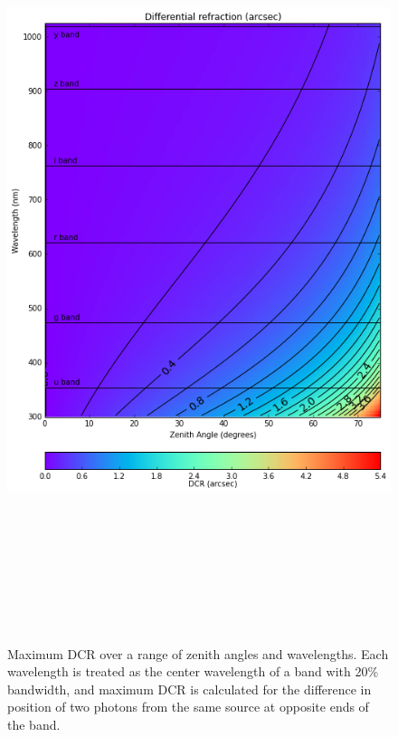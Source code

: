 \documentclass[]{article}
\begin{document}
\begin{figure}
	\begin{center}
		\includegraphics[height=9in]{DCR_ZA-wavelength}
		\caption{Maximum DCR over a range of zenith angles and wavelengths. Each wavelength is treated as the center wavelength of a band with 20\% bandwidth, and maximum DCR is calculated for the difference in position of two photons from the same source at opposite ends of the band.}
		\label{Fig:DCR-wavelength-ZA}
\end{center}
\end{figure}
\end{document}
